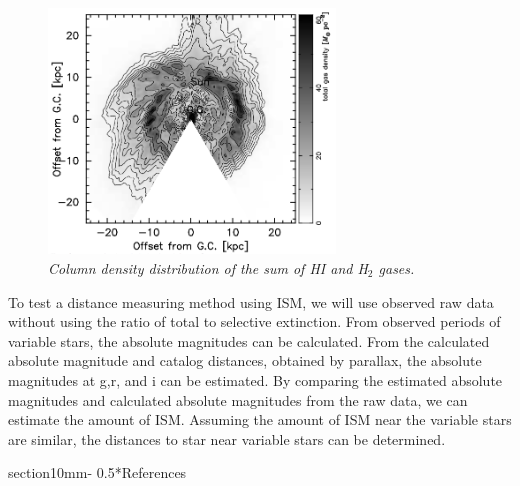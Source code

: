 \documentclass[letterpaper,11pt]{article}
\makeatletter
\renewcommand{\section}{\@startsection%
{section}{1}{0mm}{-\baselineskip}%
{0.5\baselineskip}{\normalfont\Large\bfseries}}%
\makeatother
\begin{document}
\begin{figure}[H]
  \begin{center}
\centerline{\includegraphics[width=3in]{figures/Gas.png}}
\caption{\it \small{Column density distribution of the sum of HI and H$_2$ gases. \label{fig:gas}}}
  \end{center}
\end{figure}

\noindent To test a distance measuring method using ISM, we will use observed raw data without using the ratio of total to selective extinction. From observed periods of variable stars, the absolute magnitudes can be calculated. From the calculated absolute magnitude and catalog distances, obtained by parallax, the absolute magnitudes at g,r, and i can be estimated. By comparing the estimated absolute magnitudes and calculated absolute magnitudes from the raw data, we can estimate the amount of ISM. Assuming the amount of ISM near the variable stars are similar, the distances to star near variable stars can be determined.


\clearpage
\section*{References}

\noindent{}

\noindent{}

\noindent{}
\end{document}
